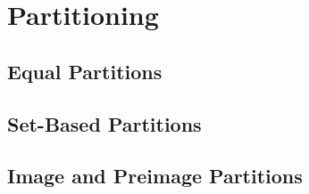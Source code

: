 \chapter{Partitioning}
\label{chap:partitioning}

\section{Equal Partitions}
\label{sec:equal}

\section{Set-Based Partitions}
\label{sec:set}

\section{Image and Preimage Partitions}
\label{sec:image}



